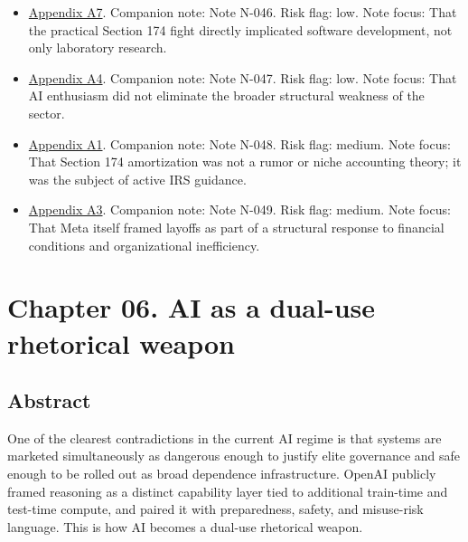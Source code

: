 \documentclass[
  american,
  11pt,
  letterpaper,
]{article}
\begin{document}
\begin{itemize}
  Congress formally moved to soften or reverse the immediate impact of
  Section 174 on domestic research expensing.
\item
  \hyperref[ch-05-appendix-a7-h-r-7024-text-deduction-for-domestic-research-and-experimental-expenditures]{Appendix
  A7}. Companion note: Note N-046. Risk flag: low. Note focus: That the
  practical Section 174 fight directly implicated software development,
  not only laboratory research.
\item
  \hyperref[ch-05-appendix-a4-ai-exuberance-masks-broad-weakness-in-tech-sector-say-investors]{Appendix
  A4}. Companion note: Note N-047. Risk flag: low. Note focus: That AI
  enthusiasm did not eliminate the broader structural weakness of the
  sector.
\item
  \hyperref[ch-05-appendix-a1-notice-2023-63-guidance-on-section-174-and-specified-research-or-experimental-expenditures]{Appendix
  A1}. Companion note: Note N-048. Risk flag: medium. Note focus: That
  Section 174 amortization was not a rumor or niche accounting theory;
  it was the subject of active IRS guidance.
\item
  \hyperref[ch-05-appendix-a3-mark-zuckerberg-s-message-to-meta-employees]{Appendix
  A3}. Companion note: Note N-049. Risk flag: medium. Note focus: That
  Meta itself framed layoffs as part of a structural response to
  financial conditions and organizational inefficiency.
\end{itemize}

\newpage

\section{Chapter 06. AI as a dual-use rhetorical
weapon}\label{chapter-06.-ai-as-a-dual-use-rhetorical-weapon}

\subsection{Abstract}\label{abstract-6}

One of the clearest contradictions in the current AI regime is that
systems are marketed simultaneously as dangerous enough to justify elite
governance and safe enough to be rolled out as broad dependence
infrastructure. OpenAI publicly framed reasoning as a distinct
capability layer tied to additional train-time and test-time compute,
and paired it with preparedness, safety, and misuse-risk language. This
is how AI becomes a dual-use rhetorical weapon.
\end{document}
